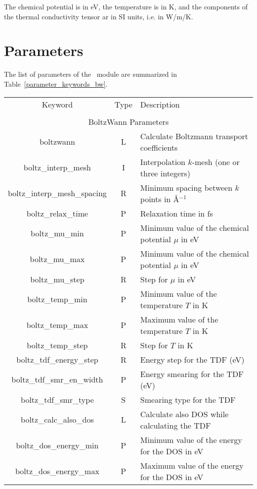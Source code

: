 The chemical potential is in eV, the temperature is in K, and the components of the thermal conductivity tensor ar in SI units, i.e. in W/m/K.
\section{Parameters}
The list of parameters of the \bw\ module are summarized in Table~\ref{parameter_keywords_bw}. 

\begin{table}
\begin{center}
\begin{tabular}{|c|c|p{6cm}|}
\hline
Keyword & Type & Description \\
        &      &             \\
\hline\hline
\multicolumn{3}{|c|}{BoltzWann Parameters} \\
\hline
{\sc boltzwann}   & L & Calculate Boltzmann transport coefficients \\
{\sc boltz\_interp\_mesh} & I & Interpolation $k$-mesh (one or three integers)\\ 
{\sc boltz\_interp\_mesh\_spacing} & R & Minimum spacing between $k$ points in \AA$^{-1}$\\
{\sc boltz\_relax\_time} & P & Relaxation time in fs\\
{\sc boltz\_mu\_min} & P & Minimum value of the chemical potential $\mu$ in eV\\
{\sc boltz\_mu\_max} & P & Minimum value of the chemical potential $\mu$ in eV\\
{\sc boltz\_mu\_step} & R & Step for $\mu$ in eV\\
{\sc boltz\_temp\_min} & P & Minimum value of the temperature $T$ in K \\
{\sc boltz\_temp\_max} & P & Maximum value of the temperature $T$ in K \\
{\sc boltz\_temp\_step} & R & Step for $T$ in K \\
{\sc boltz\_tdf\_energy\_step} & R & Energy step for the TDF (eV) \\
{\sc boltz\_tdf\_smr\_en\_width} & P & Energy smearing for the TDF (eV) \\
{\sc boltz\_tdf\_smr\_type} & S & Smearing type for the TDF \\
{\sc boltz\_calc\_also\_dos} & L & Calculate also DOS while calculating the TDF\\
{\sc boltz\_dos\_energy\_min} & P & Minimum value of the energy for the DOS in eV \\
{\sc boltz\_dos\_energy\_max} & P & Maximum value of the energy for the DOS in eV \\

\end{tabular}
\end{center}
\end{table}
